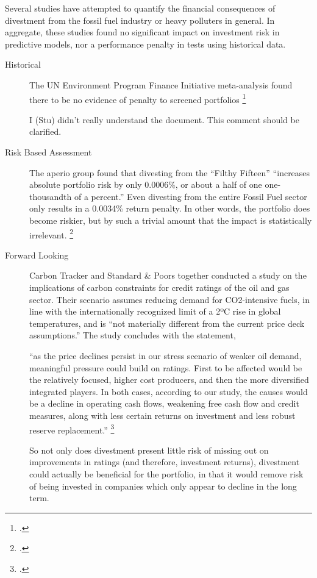 Several studies have attempted to quantify the financial consequences of divestment from the fossil fuel industry or heavy polluters in general.
In aggregate, these studies found no significant impact on investment risk in predictive models, nor a performance penalty in tests using historical data.
\begin{description}
  \item[Historical] The UN Environment Program Finance Initiative meta-analysis found there to be no evidence of penalty to screened portfolios \footcite{UNEPFI2007}
  \begin{vcom}
    I (Stu) didn't really understand the document. This comment should be clarified.
  \end{vcom}
  \item[Risk Based Assessment] The aperio group found that divesting from the ``Filthy Fifteen'' ``increases absolute portfolio risk by only 0.0006\%, or about a half of one one-thousandth of a percent.'' Even divesting from the entire Fossil Fuel sector only results in a 0.0034\% return penalty. In other words, the portfolio does become riskier, but by such a trivial amount that the impact is statistically irrelevant. \footcite{Aperio2013}
  \item[Forward Looking] Carbon Tracker and Standard \& Poors together conducted a study on the implications of carbon constraints for credit ratings of the oil and gas sector. Their scenario assumes reducing demand for CO2-intensive fuels, in line with the internationally recognized limit of a 2ºC rise in global temperatures, and is ``not materially different from the current price deck assumptions.'' The study concludes with the statement,
  \begin{slquote} ``as the price declines persist in our stress scenario of weaker oil demand, meaningful pressure could build on ratings. First to be affected would be the relatively focused, higher cost producers, and then the more diversified integrated players. In both cases, according to our study, the causes would be a decline in operating cash flows, weakening free cash flow and credit measures, along with less certain returns on investment and less robust reserve replacement.'' \footcite{SandPConstrained}
  \end{slquote}
  So not only does divestment present little risk of missing out on improvements in ratings (and therefore, investment returns), divestment could actually be beneficial for the portfolio, in that it would remove risk of being invested in companies which only appear to decline in the long term.
  
\end{description}


